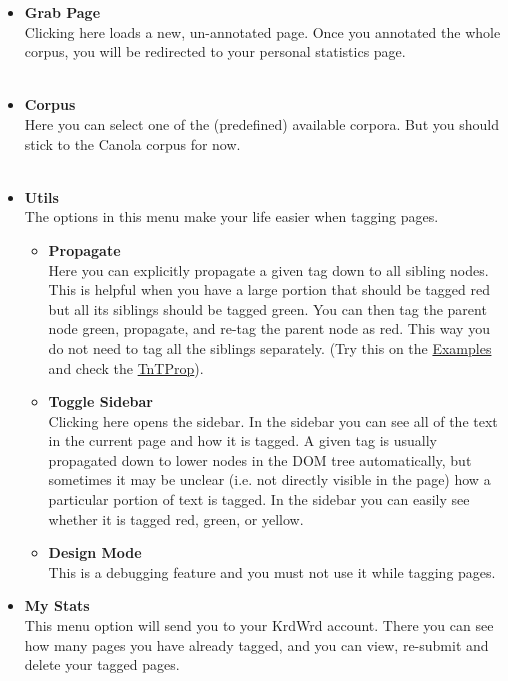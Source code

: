 \documentclass[12pt]{article}
\begin{document}
\begin{itemize}
	\item {\large \textbf{Grab Page}}\\
Clicking here loads a new, un-annotated page. Once you annotated the whole corpus, you will be redirected to your personal statistics page. \\ \\
	\item {\large \textbf{Corpus}}\\
Here you can select one of the (predefined) available corpora. But you should stick to the Canola corpus for now.\\ \\
	\item {\large \textbf{Utils}}\\
The options in this menu make your life easier when tagging pages. \\
	\begin{itemize}
		\item {\large \textbf{Propagate}}\\
Here you can explicitly propagate a given tag down to all sibling nodes. This is helpful when you have a large portion that should be tagged red but all its siblings should be tagged green. You can then tag the parent node green, propagate, and re-tag the parent node as red. This way you do not need to tag all the siblings separately. (Try this on the \hyperref{Examples}{Examples, described on page~}{}{Examples} and check the \hyperref{Tips \& Tricks}{Tips \& Tricks, page ~}{}{TnTProp}).
		\item {\large \textbf{Toggle Sidebar}}\\
Clicking here opens the sidebar. In the sidebar you can see all of the text in the current page and how it is tagged. A given tag is usually propagated down to lower nodes in the DOM tree automatically, but sometimes it may be unclear (i.e. not directly visible in the page) how a particular portion of text is tagged. In the sidebar you can easily see whether it is tagged red, green, or yellow.
		\item {\large \textbf{Design Mode}}\\
This is a debugging feature and you must not use it while tagging pages. \\
	\end{itemize}
	\item {\large \textbf{My Stats}}\\
This menu option will send you to your KrdWrd account. There you can see how many pages you have already tagged, and you can view, re-submit and delete your tagged pages. 
\end {itemize}
\end{document}
